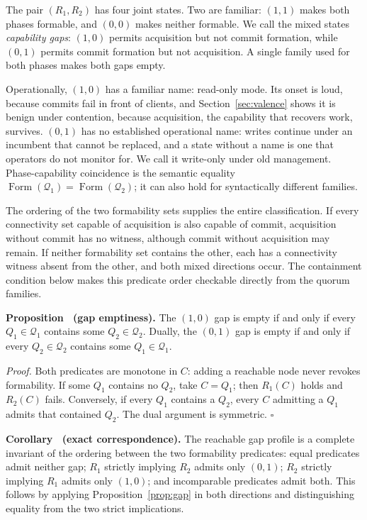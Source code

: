 \documentclass[letterpaper,twocolumn,10pt]{article}
\newcounter{prop}
\newcounter{cor}
\begin{document}
The pair $(R_1,R_2)$ has four joint states. Two are familiar: $(1,1)$ makes both phases formable, and $(0,0)$ makes neither formable. We call the mixed states \emph{capability gaps}: $(1,0)$ permits acquisition but not commit formation, while $(0,1)$ permits commit formation but not acquisition. A single family used for both phases makes both gaps empty.

Operationally, $(1,0)$ has a familiar name: read-only mode. Its onset is loud, because commits fail in front of clients, and Section~\ref{sec:valence} shows it is benign under contention, because acquisition, the capability that recovers work, survives. $(0,1)$ has no established operational name: writes continue under an incumbent that cannot be replaced, and a state without a name is one that operators do not monitor for. We call it write-only under old management. Phase-capability coincidence is the semantic equality $\operatorname{Form}(\mathcal{Q}_1)=\operatorname{Form}(\mathcal{Q}_2)$; it can also hold for syntactically different families.

The ordering of the two formability sets supplies the entire classification. If every connectivity set capable of acquisition is also capable of commit, acquisition without commit has no witness, although commit without acquisition may remain. If neither formability set contains the other, each has a connectivity witness absent from the other, and both mixed directions occur. The containment condition below makes this predicate order checkable directly from the quorum families.

\label{prop:gap}\textbf{Proposition \theprop\ (gap emptiness).} The $(1,0)$ gap is empty if and only if every $Q_1 \in \mathcal{Q}_1$ contains some $Q_2 \in \mathcal{Q}_2$. Dually, the $(0,1)$ gap is empty if and only if every $Q_2 \in \mathcal{Q}_2$ contains some $Q_1 \in \mathcal{Q}_1$.

\textit{Proof.} Both predicates are monotone in $C$: adding a reachable node never revokes formability. If some $Q_1$ contains no $Q_2$, take $C=Q_1$; then $R_1(C)$ holds and $R_2(C)$ fails. Conversely, if every $Q_1$ contains a $Q_2$, every $C$ admitting a $Q_1$ admits that contained $Q_2$. The dual argument is symmetric. \hfill $\square$

\label{cor:correspondence}\textbf{Corollary \thecor\ (exact correspondence).} The reachable gap profile is a complete invariant of the ordering between the two formability predicates: equal predicates admit neither gap; $R_1$ strictly implying $R_2$ admits only $(0,1)$; $R_2$ strictly implying $R_1$ admits only $(1,0)$; and incomparable predicates admit both. This follows by applying Proposition~\ref{prop:gap} in both directions and distinguishing equality from the two strict implications.
\end{document}
